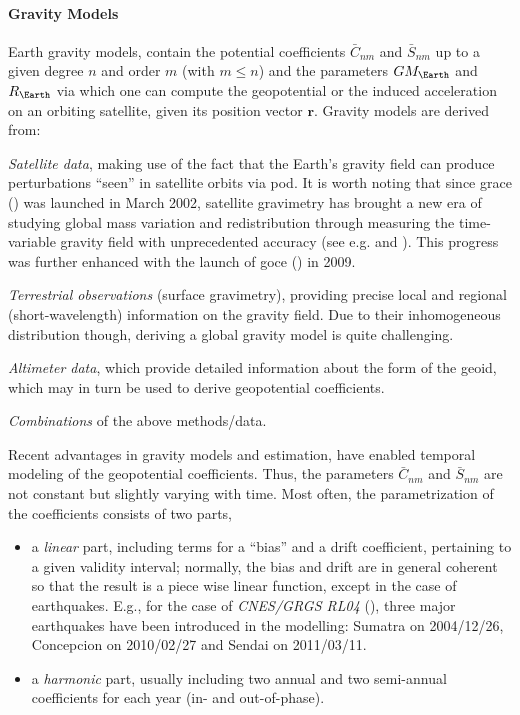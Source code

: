 \paragraph{Gravity Models}\label{par:gravity-models}

Earth gravity models, contain the potential coefficients $\bar{C}_{nm}$ and $\bar{S}_{nm}$ 
up to a given degree $n$ and order $m$ (with $m \le n$) and the parameters $GM_{\Earth}$ 
and $R_{\Earth}$ via which one can compute the geopotential or the induced acceleration 
on an orbiting satellite, given its position vector $\bm{r}$. Gravity models are derived from:
\begin{description}
  \item \emph{Satellite data}, making use of the fact that the Earth's gravity field 
    can produce perturbations ``seen'' in satellite orbits via \gls{pod}. It is worth 
    noting that since \gls{grace} (\cite{Tapley2004b}) was launched in March 2002, satellite 
    gravimetry has brought a new era of studying global mass variation and redistribution 
    through measuring the time-variable gravity field with unprecedented accuracy 
    (see e.g. \cite{Chen2022} and \cite{Jaggi2023}). This progress was further enhanced 
    with the launch of \gls{goce} (\cite{Johannessen2003}) in 2009.
  \item \emph{Terrestrial observations} (surface gravimetry), providing precise local 
    and regional (short-wavelength) information on the gravity field. Due to their 
    inhomogeneous distribution though, deriving a global gravity model is quite challenging.
  \item \emph{Altimeter data}, which provide detailed information about the form of the 
    geoid, which may in turn be used to derive geopotential coefficients.
  \item \emph{Combinations} of the above methods/data.
\end{description}

Recent advantages in gravity models and estimation, have enabled temporal modeling 
of the geopotential coefficients. Thus, the parameters $\bar{C}_{nm}$ and 
$\bar{S}_{nm}$ are not constant but slightly varying with time. Most often, the 
parametrization of the coefficients consists of two parts, 
\begin{itemize}
  \item a \emph{linear} part, including terms for a ``bias'' and a drift coefficient, pertaining 
    to a given validity interval; normally, the bias and drift are in general coherent 
    so that the result is a piece wise linear function, except in the case of earthquakes.
    E.g., for the case of \emph{CNES/GRGS RL04} (\cite{Lemoine2019}), three major 
    earthquakes have been introduced in the modelling: Sumatra on 2004/12/26, Concepcion 
    on 2010/02/27 and Sendai on 2011/03/11.
  \item a \emph{harmonic} part, usually including two annual and two semi-annual 
    coefficients for each year (in- and out-of-phase).
\end{itemize}

